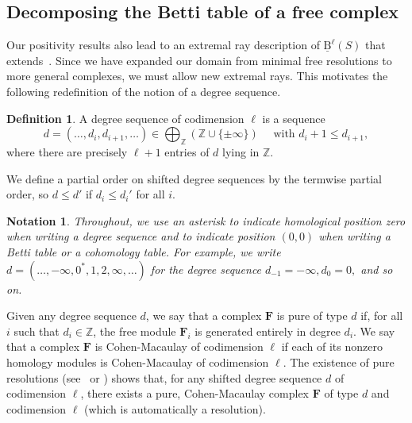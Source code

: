 \documentclass[12pt]{amsart}
\newtheorem{notation}[lemma]{Notation}
\theoremstyle{definition}
\newtheorem{defn}[lemma]{Definition}
\theoremstyle{remark}
\newcommand{\ZZ}{\mathbb{Z}}
\newcommand{\FF}{\mathbf{F}}
\newcommand{\defi}[1]{\textsf{#1}} %
\newcommand{\BBQ}{\underline{\mathrm{B}}}
\begin{document}
%
\subsection{Decomposing the Betti table of a free complex}
Our positivity results also lead to an extremal ray description of $\BBQ^{\ell}(S)$ that extends~\cite[Theorem~0.2]{eis-schrey1}.  Since we have expanded our domain from minimal free resolutions to more general complexes, we must allow new extremal rays.  This motivates the following redefinition of the notion of a degree sequence.

\begin{defn}
A \defi{degree sequence of codimension $\ell$} is a sequence
\[d=(\dots, d_i, d_{i+1}, \dots)\in \bigoplus_{\ZZ} \left(\ZZ\cup \{ \pm \infty\}\right) \quad \text{  with } d_i+1\leq d_{i+1},
\]
where there are precisely $\ell+1$ entries of $d$ lying in $\ZZ$.   
\end{defn}
We define a partial order on shifted degree sequences by the termwise partial order, so $d\leq d'$ if $d_i\leq d_i'$ for all $i$.


\begin{notation}
Throughout, we use an asterisk to indicate homological position zero when writing a degree sequence and to indicate position $(0,0)$ when writing a Betti table or a cohomology table.  For example, we write $d=(\dots, -\infty, 0^*,1,2,\infty, \dots)$ for the degree sequence $d_{-1}=-\infty, d_0=0,$ and so on.
\end{notation}


Given any degree sequence $d$, we say that a complex $\FF$ is \defi{pure of type $d$} if, for all $i$ such that $d_i\in \ZZ$, the free module $\FF_i$ is generated entirely in degree $d_i$.  We say that a complex $\FF$ is \defi{Cohen-Macaulay of codimension $\ell$} if each of its nonzero homology modules is Cohen-Macaulay of codimension $\ell$. The existence of pure resolutions (see~\cite{efw} or \cite[\S5]{eis-schrey1}) shows that, for any shifted degree sequence $d$ of codimension $\ell$, there exists a pure, Cohen-Macaulay complex $\FF$ of type $d$ and codimension $\ell$ (which is automatically a resolution).
\end{document}
